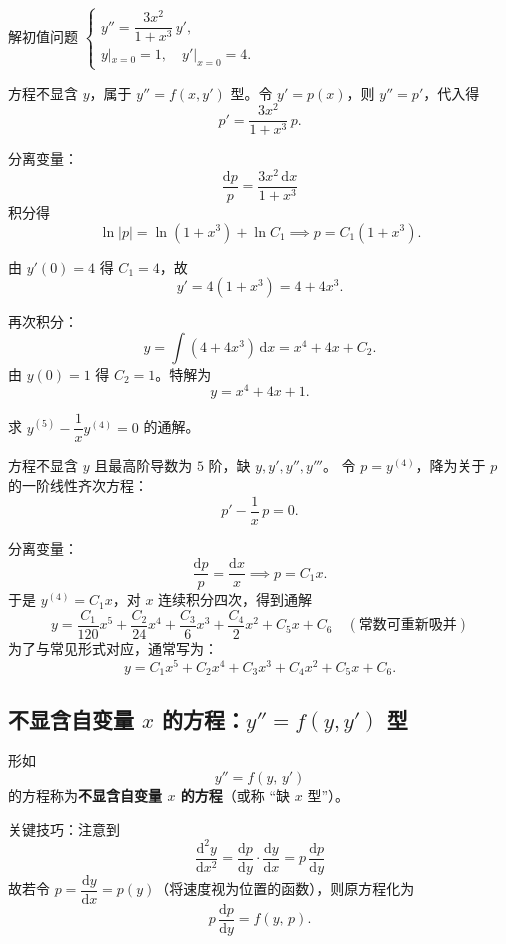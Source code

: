 \documentclass[lang=cn,11pt]{elegantbook}
\begin{document}
\begin{exercise}
解初值问题
$\begin{cases}
y''=\dfrac{3x^{2}}{1+x^{3}}\,y',\\
y|_{x=0}=1,\quad y'|_{x=0}=4.
\end{cases}$
\end{exercise}
\begin{solution}
方程不显含 $y$，属于 $y''=f(x,y')$ 型。令 $y'=p(x)$，则 $y''=p'$，代入得
\[
p'=\frac{3x^{2}}{1+x^{3}}\,p.
\]

分离变量：
\[
\frac{\mathrm{d}p}{p}=\frac{3x^{2}\,\mathrm{d}x}{1+x^{3}}
\]
积分得 
\[
\ln|p|=\ln(1+x^{3})+\ln C_1 \implies p=C_{1}(1+x^{3}).
\]

由 $y'(0)=4$ 得 $C_1=4$，故 
\[
y'=4(1+x^{3})=4+4x^{3}.
\]

再次积分：
\[
y=\int(4+4x^{3})\,\mathrm{d}x=x^{4}+4x+C_{2}.
\]
由 $y(0)=1$ 得 $C_2=1$。特解为
\[
\boxed{y=x^{4}+4x+1.}
\]
\end{solution}

\begin{exercise}
求 $y^{(5)}-\dfrac{1}{x}y^{(4)}=0$ 的通解。
\end{exercise}
\begin{solution}
方程不显含 $y$ 且最高阶导数为 $5$ 阶，缺 $y,y',y'',y'''$。
令 $p=y^{(4)}$，降为关于 $p$ 的一阶线性齐次方程：
\[
p'-\frac{1}{x}\,p=0.
\]

分离变量：
\[
\frac{\mathrm{d}p}{p}=\frac{\mathrm{d}x}{x} \implies p=C_{1}x.
\]
于是 $y^{(4)}=C_{1}x$，对 $x$ 连续积分四次，得到通解
\[
\boxed{y=\frac{C_1}{120}x^{5}+\frac{C_2}{24}x^{4}+\frac{C_3}{6}x^{3}+\frac{C_4}{2}x^{2}+C_5x+C_6} \quad (\text{常数可重新吸并})
\]
为了与常见形式对应，通常写为：
\[
\boxed{y=C_1 x^{5}+C_2 x^{4}+C_3 x^{3}+C_4 x^{2}+C_5 x+C_{6}.}
\]
\end{solution}


\subsection{不显含自变量 $x$ 的方程：$y''=f(y,y')$ 型}

\begin{definition} \label{def:ode-missing-x}
形如
\[y''=f(y,\,y')
\]
的方程称为\textbf{不显含自变量 $x$ 的方程}（或称 ``缺 $x$ 型''）。
\end{definition}

关键技巧：注意到 
\[
\dfrac{\mathrm{d}^2y}{\mathrm{d}x^{2}}
=\dfrac{\mathrm{d}p}{\mathrm{d}y}\cdot\dfrac{\mathrm{d}y}{\mathrm{d}x}=p\,\dfrac{\mathrm{d}p}{\mathrm{d}y}
\]
故若令 $p=\dfrac{\mathrm{d}y}{\mathrm{d}x}=p(y)$（将速度视为位置的函数），则原方程化为
\[
p\,\frac{\mathrm{d}p}{\mathrm{d}y}=f(y,\,p).
\]
\end{document}
